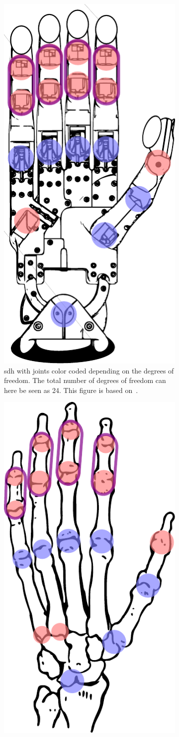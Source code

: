 \begin{figure}[h]
	\centering
	\begin{subfigure}[b]{0.48\textwidth}
		\centering
		\includegraphics[height=\textwidth]{chapters/system-setup/fig/robot-hand-skeleton-coupled.pdf}
		\caption{\gls{sdh} with joints color coded depending on the degrees of freedom. The total number of degrees of freedom can here be seen as \num{24}. This figure is based on~\cite{svg-robot-hand}.}
		\label{fig:robot-hand-skeleton}
	\end{subfigure}
	\hfill
	\begin{subfigure}[b]{0.48\textwidth}
		\centering
		\includegraphics[height=\textwidth]{chapters/system-setup/fig/human-skeleton-hand-coupled.pdf}

\end{subfigure}
\end{figure}
